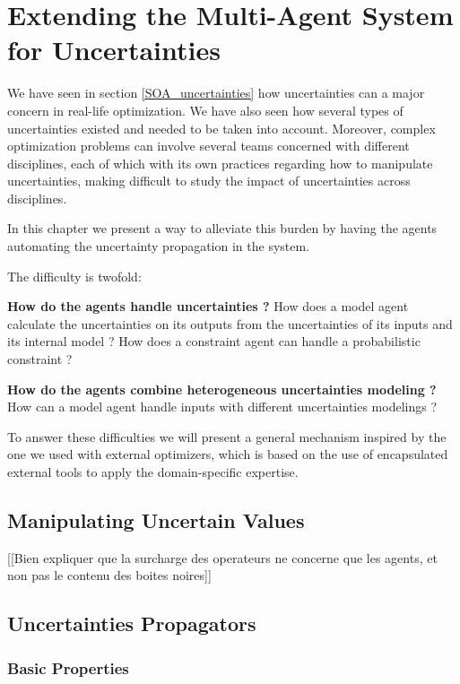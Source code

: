 \chapter{Extending the Multi-Agent System for Uncertainties}

We have seen in section \ref{SOA_uncertainties} how uncertainties can a major concern in real-life optimization. We have also seen how several types of uncertainties existed and needed to be taken into account. Moreover, complex optimization problems can involve several teams concerned with different disciplines, each of which with its own practices regarding how to manipulate uncertainties, making difficult to study the impact of uncertainties across disciplines.

In this chapter we present a way to alleviate this burden by having the agents automating the uncertainty propagation in the system.

The difficulty is twofold:
\begin{compactitem}
\item \textbf{How do the agents handle uncertainties ?}
How does a model agent calculate the uncertainties on its outputs from the uncertainties of its inputs and its internal model ? How does a constraint agent can handle a probabilistic constraint ?

\item \textbf{How do the agents combine heterogeneous uncertainties modeling ?}
How can a model agent handle inputs with different uncertainties modelings ?
\end{compactitem}

To answer these difficulties we will present a general mechanism inspired by the one we used with external optimizers, which is based on the use of encapsulated external tools to apply the domain-specific expertise.

\section{Manipulating Uncertain Values}

[[Bien expliquer que la surcharge des operateurs ne concerne que les agents, et non pas le contenu des boites noires]]

\section{Uncertainties Propagators}

\subsection{Basic Properties}

